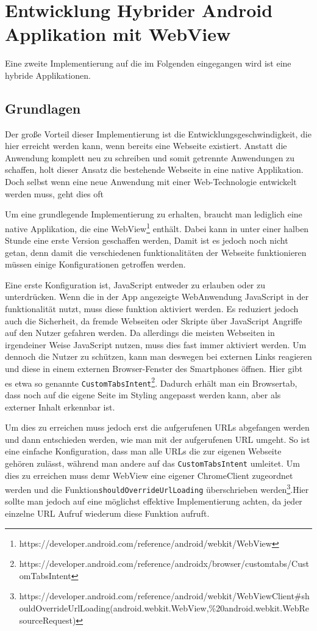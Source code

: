 \section{Entwicklung Hybrider Android Applikation mit WebView}

Eine zweite Implementierung auf die im Folgenden eingegangen wird ist eine hybride Applikationen. 

\subsection{Grundlagen}
Der große Vorteil dieser Implementierung ist die Entwicklungsgeschwindigkeit, die hier erreicht werden kann, wenn bereits eine Webseite existiert. Anstatt die Anwendung komplett neu zu schreiben und somit getrennte Anwendungen zu schaffen, holt dieser Ansatz die bestehende Webseite in eine native Applikation. Doch selbst wenn eine neue Anwendung mit einer Web-Technologie entwickelt werden muss, geht dies oft 

Um eine grundlegende Implementierung zu erhalten, braucht man lediglich eine native Applikation, die eine WebView\footnote{https://developer.android.com/reference/android/webkit/WebView} enthält. Dabei kann in unter einer halben Stunde eine erste Version geschaffen werden,
Damit ist es jedoch noch nicht getan, denn damit die verschiedenen funktionalitäten der Webseite funktionieren müssen einige Konfigurationen getroffen werden.

Eine erste Konfiguration ist, JavaScript entweder zu erlauben oder zu unterdrücken. Wenn die in der App angezeigte WebAnwendung JavaScript in der funktionalität nutzt, muss diese funktion aktiviert werden. Es reduziert jedoch auch die Sicherheit, da fremde Webseiten oder Skripte über JavaScript Angriffe auf den Nutzer gefahren werden. Da allerdings die meisten Webseiten in irgendeiner Weise JavaScript nutzen, muss dies fast immer aktiviert werden. Um dennoch die Nutzer zu schützen, kann man deswegen bei externen Links reagieren und diese in einem externen Browser-Fenster des Smartphones öffnen. Hier gibt es etwa so genannte \verb|CustomTabsIntent|\footnote{https://developer.android.com/reference/androidx/browser/customtabs/CustomTabsIntent}. Dadurch erhält man ein Browsertab, dass noch auf die eigene Seite im Styling angepasst werden kann, aber als externer Inhalt erkennbar ist.

Um dies zu erreichen muss jedoch erst die aufgerufenen URLs abgefangen werden und dann entschieden werden, wie man mit der aufgerufenen URL umgeht. So ist eine einfache Konfiguration, dass man alle URLs die zur eigenen Webseite gehören zulässt, während man andere auf das \verb|CustomTabsIntent| umleitet. Um dies zu erreichen muss demr WebView eine eigener ChromeClient zugeordnet werden und die Funktion\verb|shouldOverrideUrlLoading| überschrieben werden\footnote{https://developer.android.com/reference/android/webkit/WebViewClient\#shouldOverrideUrlLoading(android.webkit.WebView,\%20android.webkit.WebResourceRequest)}.Hier sollte man jedoch auf eine möglichst effektive Implementierung achten, da jeder einzelne URL Aufruf wiederum diese Funktion aufruft.

